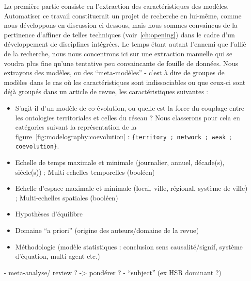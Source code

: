 La première partie consiste en l'extraction des caractéristiques des modèles. Automatiser ce travail constituerait un projet de recherche en lui-même, comme nous développons en discussion ci-dessous, mais nous sommes convaincus de la pertinence d'affiner de telles techniques (voir~\ref{ch:opening}) dans le cadre d'un développement de disciplines intégrées. Le temps étant autant l'ennemi que l'allié de la recherche, nous nous concentrons ici sur une extraction manuelle qui se voudra plus fine qu'une tentative peu convaincante de fouille de données. Nous extrayons des modèles, ou des ``meta-modèles'' - c'est à dire de groupes de modèles dans le cas où les caractéristiques sont indissociables ou que ceux-ci sont déjà groupés dans un article de revue, les caractéristiques suivantes :

\begin{itemize}
\item S'agit-il d'un modèle de co-évolution, ou quelle est la force du couplage entre les ontologies territoriales et celles du réseau ? Nous classerons pour cela en catégories suivant la représentation de la figure~\ref{fig:modelography:coevolution} : \texttt{\{territory ; network ; weak ; coevolution\}}.
\item Echelle de temps maximale et minimale (journalier, annuel, décade(s), siècle(s)) ; Multi-echelles temporelles (booléen)
\item Echelle d'espace maximale et minimale (local, ville, régional, système de ville) ; Multi-echelles spatiales (booléen)
\item Hypothèses d'équilibre
\item Domaine ``a priori'' (origine des auteurs/domaine de la revue)
\item Méthodologie (modèle statistiques : conclusion sens causalité/signif, système d'équation, multi-agent etc.)
\end{itemize}

- meta-analyse/ review ? -> pondérer ?
- ``subject'' (ex HSR dominant ?)


